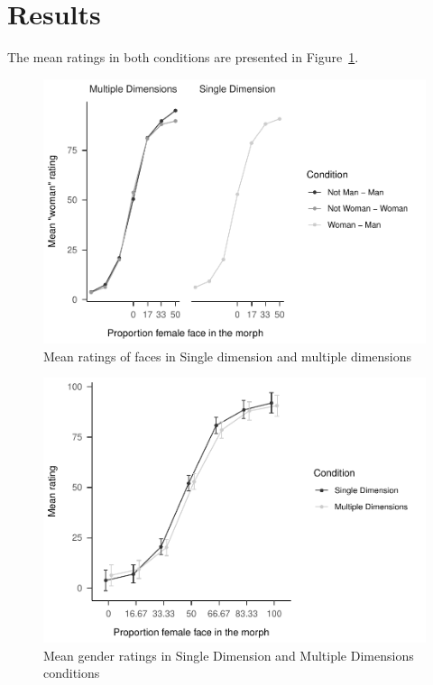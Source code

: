 \documentclass[
  man]{apa7}
\begin{document}
\hypertarget{results-1}{%
\section{Results}\label{results-1}}

The mean ratings in both conditions are presented in Figure~\ref{fig:descriptives-two}.

\begin{figure}
\centering
\includegraphics{resp_opts_manus23022_files/figure-latex/descriptives-two-1.pdf}
\caption{\label{fig:descriptives-two}Mean ratings of faces in Single dimension and multiple dimensions}
\end{figure}

\begin{figure}
\centering
\includegraphics{resp_opts_manus23022_files/figure-latex/exp-two-inf-1.pdf}
\caption{\label{fig:exp-two-inf}Mean gender ratings in Single Dimension and Multiple Dimensions conditions}
\end{figure}
\end{document}
